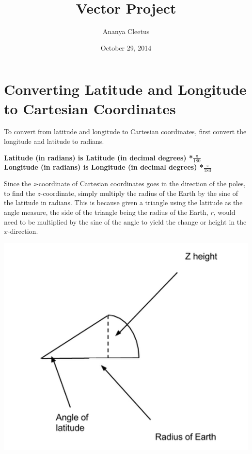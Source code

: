 \documentclass[a4paper]{article}
\begin{document}
\title{Vector Project}

\author{Ananya Cleetus}

\date{October 29, 2014}



\maketitle

\section{Converting Latitude and Longitude to Cartesian Coordinates }

To convert from latitude and longitude to Cartesian coordinates, first convert the longitude and latitude to radians. 
\bigskip
\begin{center}
\textbf{Latitude (in radians) is Latitude (in decimal degrees) *$\frac{\pi}{180}$}\\
\textbf{Longitude (in radians) is Longitude (in decimal degrees) *$\frac{\pi} {180}$}\\
\end{center}
\bigskip
Since the $z$-coordinate of Cartesian coordinates goes in the direction of the poles, to find the $z$-coordinate, simply multiply the radius of the Earth by the sine of the latitude in radians. This is because given a triangle using the latitude as the angle measure, the side of the triangle being the radius of the Earth, $r$, would need to be multiplied by the sine of the angle to yield the change or height in the $x$-direction.

\begin{center}
\includegraphics[scale=.375]{vec1.png}
\end{center}
\end{document}
